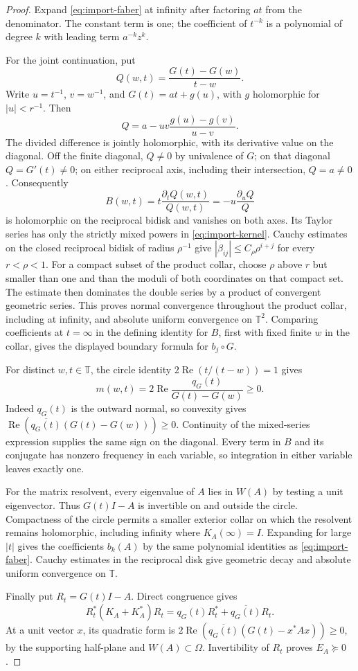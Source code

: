 \documentclass[11pt]{article}
\newcommand{\T}{\mathbb T}
\theoremstyle{definition}
\theoremstyle{remark}
\numberwithin{equation}{section}
\begin{document}
\begin{proof}
Expand \eqref{eq:import-faber} at infinity after factoring $at$ from the
denominator. The constant term is one; the coefficient of $t^{-k}$ is a
polynomial of degree $k$ with leading term $a^{-k}z^k$.

For the joint continuation, put
\[
 Q(w,t)=\frac{G(t)-G(w)}{t-w}.
\]
Write $u=t^{-1}$, $v=w^{-1}$, and $G(t)=at+g(u)$, with $g$
holomorphic for $|u|<r^{-1}$. Then
\[
 Q=a-uv\frac{g(u)-g(v)}{u-v}.
\]
The divided difference is jointly holomorphic, with its derivative value
on the diagonal. Off the finite diagonal, $Q\ne0$ by univalence of
$G$; on that diagonal $Q=G'(t)\ne0$; on either reciprocal axis,
including their intersection, $Q=a\ne0$. Consequently
\[
 B(w,t)=t\frac{\partial_tQ(w,t)}{Q(w,t)}
        =-u\frac{\partial_uQ}{Q}
\]
is holomorphic on the reciprocal bidisk and vanishes on both axes.
Its Taylor series has only the strictly mixed powers in
\eqref{eq:import-kernel}. Cauchy estimates on the closed reciprocal
bidisk of radius $\rho^{-1}$ give
$|\beta_{ij}|\le C_\rho\rho^{i+j}$ for every $r<\rho<1$.
For a compact subset of the product collar, choose $\rho$ above $r$
but smaller than one and than the moduli of both coordinates on that
compact set. The estimate then dominates the double series by a product
of convergent geometric series. This proves normal convergence throughout
the product collar, including at infinity, and absolute uniform convergence
on $\T^2$.
Comparing coefficients at $t=\infty$ in the defining identity for $B$,
first with fixed finite $w$ in the collar, gives the displayed boundary
formula for $b_j\circ G$.

For distinct $w,t\in\T$, the circle identity
$2\operatorname{Re}(t/(t-w))=1$ gives
\[
 m(w,t)=2\operatorname{Re}\frac{q_G(t)}{G(t)-G(w)}\ge0.
\]
Indeed $q_G(t)$ is the outward normal, so convexity gives
$\operatorname{Re}(\overline{q_G(t)}(G(t)-G(w)))\ge0$.
Continuity of the mixed-series expression supplies the same sign on the
diagonal. Every term in $B$ and its conjugate has nonzero frequency in
each variable, so integration in either variable leaves exactly one.

For the matrix resolvent, every eigenvalue of $A$ lies in $W(A)$ by
testing a unit eigenvector. Thus $G(t)I-A$ is invertible on and outside
the circle. Compactness of the circle permits a smaller exterior collar
on which the resolvent remains holomorphic, including infinity where
$K_A(\infty)=I$. Expanding for large $|t|$ gives the coefficients
$b_k(A)$ by the same polynomial identities as \eqref{eq:import-faber}.
Cauchy estimates in the reciprocal disk give geometric decay and
absolute uniform convergence on $\T$.

Finally put $R_t=G(t)I-A$. Direct congruence gives
\[
 R_t^*(K_A+K_A^*)R_t=q_G(t)R_t^*+\overline{q_G(t)}R_t.
\]
At a unit vector $x$, its quadratic form is
$2\operatorname{Re}(\overline{q_G(t)}(G(t)-x^*Ax))\ge0$,
by the supporting half-plane and $W(A)\subset\Omega$.
Invertibility of $R_t$ proves $E_A\succeq0$.
\end{proof}
\end{document}
